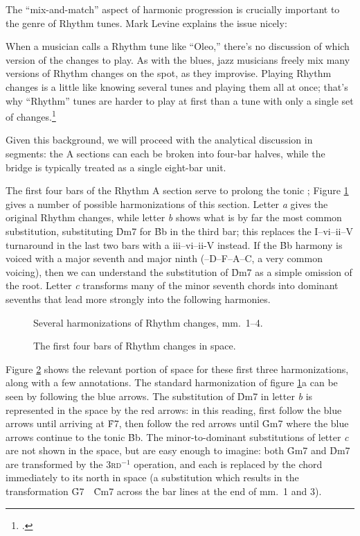 The ``mix-and-match'' aspect of harmonic progression is crucially important to
the genre of Rhythm tunes. Mark Levine explains the issue
nicely:%
%
\begin{quoting}
  \singlespacing
  When a musician calls a Rhythm tune like ``Oleo,'' there's no discussion of
  which version of the changes to play. As with the blues, jazz musicians
  freely mix many versions of Rhythm changes on the spot, as they improvise.
  Playing Rhythm changes is a little like knowing several tunes and playing
  them all at once; that's why ``Rhythm'' tunes are harder to play at first
  than a tune with only a single set of changes.\footcite[241]{levine:1995}
\end{quoting}
%
Given this background, we will proceed with the analytical discussion in
segments: the A sections can each be broken into four-bar halves, while the
bridge is typically treated as a single eight-bar unit.

The first four bars of the Rhythm A section serve to prolong the tonic \Bflat;
Figure \ref{rcg:rc-first-four} gives a number of possible harmonizations of
this section. Letter \emph{a} gives the original Rhythm changes,
while letter \emph{b} shows what is by far the most common substitution,
substituting \h{Dm7} for \h{Bb} in the third bar; this replaces the
I--vi--ii--V turnaround in the last two bars with a iii--vi--ii-V instead. If
the \h{Bb} harmony is voiced with a major seventh and major ninth
(\Bflat--D--F--A--C, a very common voicing), then we can understand the
substitution of \h{Dm7} as a simple omission of the root. Letter \emph{c}
transforms many of the minor seventh chords into dominant sevenths that lead
more strongly into the following harmonies.

\begin{figure}[tbp]
  \caption{Several harmonizations of Rhythm changes, mm.~1--4.}
  \label{rcg:rc-first-four}
\end{figure}

\begin{figure}[tbp]
  \caption{The first four bars of Rhythm changes in \tf space.}
  \label{rcg:rc-first-four-space}
\end{figure}

Figure \ref{rcg:rc-first-four-space} shows the relevant portion of \tf space
for these first three harmonizations, along with a few annotations. The
standard harmonization of figure \ref{rcg:rc-first-four}a can be seen by
following the blue arrows. The substitution of \h{Dm7} in letter \emph{b} is
represented in the space by the red arrows: in this reading, first follow the
blue arrows until arriving at \h{F7}, then follow the red arrows until \h{Gm7}
where the blue arrows continue to the tonic \h{Bb}. The minor-to-dominant
substitutions of letter \emph{c} are not shown in the space, but are easy
enough to imagine: both \h{Gm7} and \h{Dm7} are transformed by the
\textsc{3rd}$^{-1}$ operation, and each is replaced by the chord immediately
to its north in \tf space (a substitution which results in the transformation
\mbox{\h{G7} \ECarrow\ \h{Cm7}} across the bar lines at the end of mm.~1 and
3).

